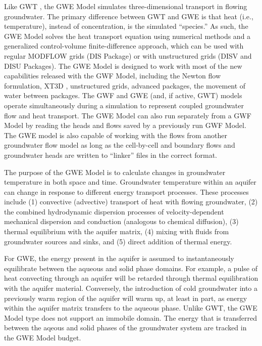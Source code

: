 Like GWT \citep{modflow6gwt}, the GWE Model simulates three-dimensional transport in flowing groundwater.  The primary difference between GWT and GWE is that heat (i.e., temperature), instead of concentration, is the simulated ``species.'' As such, the GWE Model solves the heat transport equation using numerical methods and a generalized control-volume finite-difference approach, which can be used with regular MODFLOW grids (DIS Package) or with unstructured grids (DISV and DISU Packages).  The GWE Model is designed to work with most of the new capabilities released with the GWF Model, including the Newton flow formulation, XT3D \citep{modflow6xt3d}, unstructured grids, advanced packages, the movement of water between packages.  The GWF and GWE (and, if active, GWT) models operate simultaneously during a \mf simulation to represent coupled groundwater flow and heat transport.  The GWE Model can also run separately from a GWF Model by reading the heads and flows saved by a previously run GWF Model.  The GWE model is also capable of working with the flows from another groundwater flow model as long as the cell-by-cell and boundary flows and groundwater heads are written to ``linker'' files in the correct format.  

The purpose of the GWE Model is to calculate changes in groundwater temperature in both space and time.  Groundwater temperature within an aquifer can change in response to different energy transport processes.  These processes include (1) convective (advective) transport of heat with flowing groundwater, (2) the combined hydrodynamic dispersion processes of velocity-dependent mechanical dispersion and conduction (analogous to chemical diffusion), (3) thermal equilibrium with the aquifer matrix, (4) mixing with fluids from groundwater sources and sinks, and (5) direct addition of thermal energy.

For GWE, the energy present in the aquifer is assumed to instantaneously equilibrate between the aqueous and solid phase domains.  For example, a pulse of heat convecting through an aquifer will be retarded through thermal equilibration with the aquifer material.  Conversely, the introduction of cold groundwater into a previously warm region of the aquifer will warm up, at least in part, as energy within the aquifer matrix transfers to the aqueous phase.  Unlike GWT, the GWE Model type does not support an immobile domain.  The energy that is transferred between the aqeous and solid phases of the groundwater system are tracked in the GWE Model budget.

